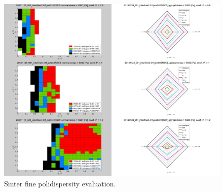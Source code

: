 \begin{figure}[!htb]
\centering
\includegraphics[width=.96\columnwidth]{images/086sinter0315}
\caption[Sinter fine polidispersity evaluation]{Sinter fine polidispersity evaluation.}
\label{fig:086sinter0315}
\end{figure}